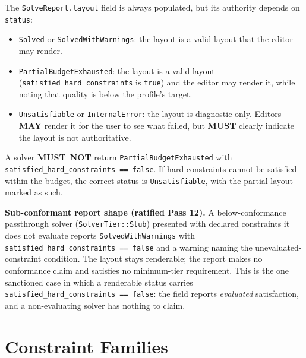 \documentclass[11pt,letterpaper]{report}
\newcounter{requirement}[chapter]
\newcommand{\MUST}{\textbf{MUST}}
\newcommand{\MUSTNOT}{\textbf{MUST}\nobreak\ \textbf{NOT}}
\newcommand{\MAY}{\textbf{MAY}}
\begin{document}
\begin{requirement}
  \label{req:solver:report-authority}
  The \texttt{SolveReport.layout} field is always populated, but
  its authority depends on \texttt{status}:

  \begin{itemize}
    \item \texttt{Solved} or \texttt{SolvedWithWarnings}: the
      layout is a valid layout that the editor may render.
    \item \texttt{PartialBudgetExhausted}: the layout is a valid
      layout (\texttt{satisfied\_hard\_constraints} is \texttt{true})
      and the editor may render it, while noting that quality
      is below the profile's target.
    \item \texttt{Unsatisfiable} or \texttt{InternalError}: the
      layout is diagnostic-only. Editors \MAY{} render it for the
      user to see what failed, but \MUST{} clearly indicate the
      layout is not authoritative.
  \end{itemize}

  A solver \MUSTNOT{} return \texttt{PartialBudgetExhausted} with
  \texttt{satisfied\_hard\_constraints == false}. If hard constraints
  cannot be satisfied within the budget, the correct status is
  \texttt{Unsatisfiable}, with the partial layout marked as such.
\end{requirement}

\begin{requirement}
  \label{req:solver:subconformant-report}
  \textbf{Sub-conformant report shape (ratified Pass 12).}
  A below-conformance passthrough solver (\texttt{SolverTier::Stub})
  presented with declared constraints it does not evaluate reports
  \texttt{SolvedWithWarnings} with
  \texttt{satisfied\_hard\_constraints == false} and a warning
  naming the unevaluated-constraint condition. The layout stays
  renderable; the report makes no conformance claim and satisfies
  no minimum-tier requirement. This is the one sanctioned case in
  which a renderable status carries
  \texttt{satisfied\_hard\_constraints == false}: the field reports
  \emph{evaluated} satisfaction, and a non-evaluating solver has
  nothing to claim.
\end{requirement}

\section{Constraint Families}
\label{sec:solver:families}
\end{document}

